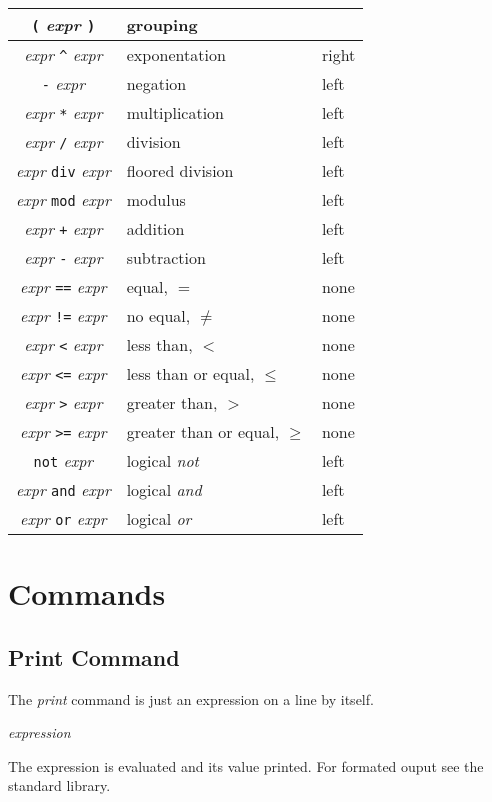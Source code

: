 \documentclass{article}
\begin{document}
\begin{center}
  \begin{tabular}{cll}
    \verb|(| \emph{expr} \verb|)| & grouping  \\ \hline
    \emph{expr} \verb|^| \emph{expr} & exponentation & right \\ \hline
    \verb|-| \emph{expr} & negation & left \\ \hline
    \emph{expr} \verb|*| \emph{expr} & multiplication & left \\
    \emph{expr} \verb|/| \emph{expr} & division & left \\
    \emph{expr} \verb|div| \emph{expr} & floored division & left \\
    \emph{expr} \verb|mod| \emph{expr} & modulus & left \\ \hline
    \emph{expr} \verb|+| \emph{expr} & addition & left \\
    \emph{expr} \verb|-| \emph{expr} & subtraction & left \\ \hline
    \emph{expr} \verb|==| \emph{expr} & equal, $=$ & none \\
    \emph{expr} \verb|!=| \emph{expr} & no equal, $\ne$ & none \\
    \emph{expr} \verb|<| \emph{expr} & less than, $<$ & none \\
    \emph{expr} \verb|<=| \emph{expr} & less than or equal, $\le$ & none \\
    \emph{expr} \verb|>| \emph{expr} & greater than, $>$ & none \\
    \emph{expr} \verb|>=| \emph{expr} & greater than or equal, $\ge$ & none \\ \hline
    \verb|not| \emph{expr} & logical \emph{not} & left \\ \hline
    \emph{expr} \verb|and| \emph{expr} & logical \emph{and} & left \\ \hline
    \emph{expr} \verb|or| \emph{expr} & logical \emph{or} & left \\
  \end{tabular}
\end{center}
\section{Commands}
\subsection{Print Command}
The \emph{print} command is just an expression on a line by itself.
\begin{center}
  \emph{expression}
\end{center}
The expression is evaluated and its value printed.
For formated ouput see the standard library.
\end{document}
